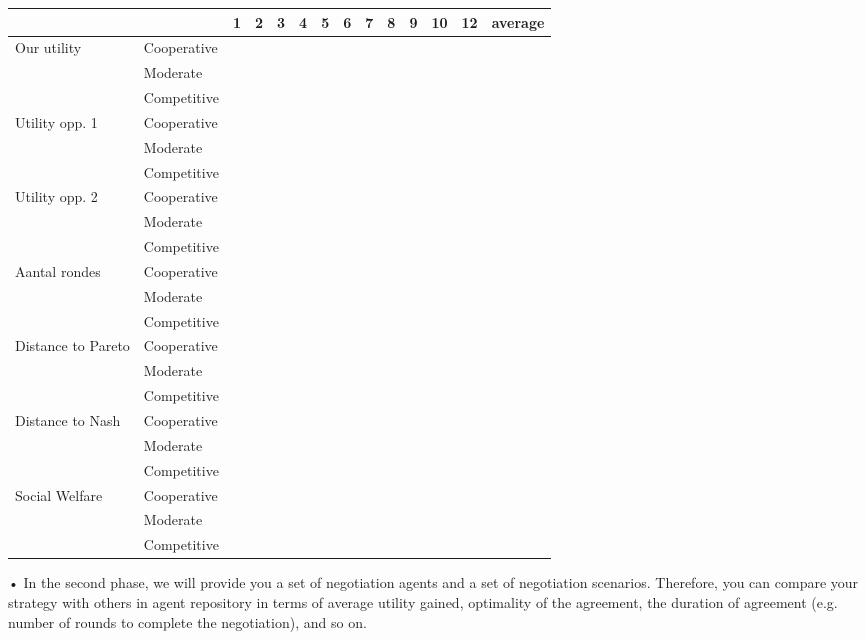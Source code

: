 \documentclass[11pt,a4paper]{report}
\begin{document}
\begin{table}
\centering
\begin{tabular}{|l|l|c|c|c|c|c|c|c|c|c|c|c|c|}
\hline
&& 1 & 2 & 3 & 4 & 5 & 6 & 7 & 8 & 9 & 10 & 12 & average \\
            \hline
Our utility & Cooperative & &&&&&&&&&&& \\
            & Moderate    & &&&&&&&&&&& \\
            & Competitive & &&&&&&&&&&& \\
            \hline
Utility opp. 1 & Cooperative & &&&&&&&&&&& \\
            & Moderate    & &&&&&&&&&&& \\
            & Competitive & &&&&&&&&&&& \\
            \hline
Utility opp. 2 & Cooperative & &&&&&&&&&&& \\
            & Moderate    & &&&&&&&&&&& \\
            & Competitive & &&&&&&&&&&& \\
            \hline
Aantal rondes & Cooperative & &&&&&&&&&&& \\
            & Moderate    & &&&&&&&&&&& \\
            & Competitive & &&&&&&&&&&& \\
            \hline
Distance to Pareto & Cooperative & &&&&&&&&&&& \\
            & Moderate    & &&&&&&&&&&& \\
            & Competitive & &&&&&&&&&&& \\
            \hline
Distance to Nash & Cooperative & &&&&&&&&&&& \\
            & Moderate    & &&&&&&&&&&& \\
            & Competitive & &&&&&&&&&&& \\
            \hline
Social Welfare & Cooperative & &&&&&&&&&&& \\
            & Moderate    & &&&&&&&&&&& \\
            & Competitive & &&&&&&&&&&& \\
            \hline
\end{tabular}
\end{table}


• In the second phase, we will provide you a set of negotiation agents and a set of negotiation scenarios. Therefore, you can compare your strategy with others in agent repository in terms of average utility gained, optimality of the agreement, the duration of agreement (e.g. number of rounds to complete the negotiation), and so on.
\end{document}
